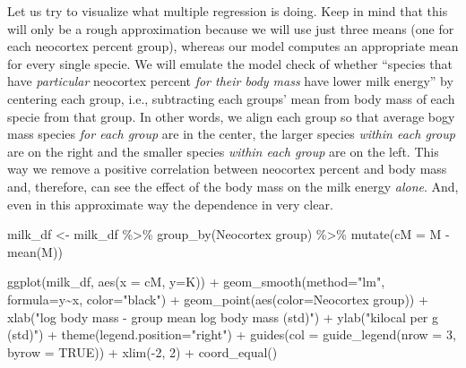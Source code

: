 \documentclass[
]{book}
\newenvironment{Shaded}{\begin{snugshade}}{\end{snugshade}}
\newcommand{\AttributeTok}[1]{\textcolor[rgb]{0.77,0.63,0.00}{#1}}
\newcommand{\ConstantTok}[1]{\textcolor[rgb]{0.00,0.00,0.00}{#1}}
\newcommand{\DecValTok}[1]{\textcolor[rgb]{0.00,0.00,0.81}{#1}}
\newcommand{\FunctionTok}[1]{\textcolor[rgb]{0.00,0.00,0.00}{#1}}
\newcommand{\NormalTok}[1]{#1}
\newcommand{\OtherTok}[1]{\textcolor[rgb]{0.56,0.35,0.01}{#1}}
\newcommand{\SpecialCharTok}[1]{\textcolor[rgb]{0.00,0.00,0.00}{#1}}
\newcommand{\StringTok}[1]{\textcolor[rgb]{0.31,0.60,0.02}{#1}}
\begin{document}
Let us try to visualize what multiple regression is doing. Keep in mind that this will only be a rough approximation because we will use just three means (one for each neocortex percent group), whereas our model computes an appropriate mean for every single specie. We will emulate the model check of whether ``species that have \emph{particular} neocortex percent \emph{for their body mass} have lower milk energy'' by centering each group, i.e., subtracting each groups' mean from body mass of each specie from that group. In other words, we align each group so that average bogy mass species \emph{for each group} are in the center, the larger species \emph{within each group} are on the right and the smaller species \emph{within each group} are on the left. This way we remove a positive correlation between neocortex percent and body mass and, therefore, can see the effect of the body mass on the milk energy \emph{alone}. And, even in this approximate way the dependence in very clear.

\begin{Shaded}
\begin{Highlighting}[]
\NormalTok{milk\_df }\OtherTok{\textless{}{-}} 
\NormalTok{  milk\_df }\SpecialCharTok{\%\textgreater{}\%}
  \FunctionTok{group\_by}\NormalTok{(}\StringTok{\textasciigrave{}}\AttributeTok{Neocortex group}\StringTok{\textasciigrave{}}\NormalTok{) }\SpecialCharTok{\%\textgreater{}\%}
  \FunctionTok{mutate}\NormalTok{(}\AttributeTok{cM =}\NormalTok{ M }\SpecialCharTok{{-}} \FunctionTok{mean}\NormalTok{(M))}

\FunctionTok{ggplot}\NormalTok{(milk\_df, }\FunctionTok{aes}\NormalTok{(}\AttributeTok{x =}\NormalTok{ cM, }\AttributeTok{y=}\NormalTok{K)) }\SpecialCharTok{+} 
  \FunctionTok{geom\_smooth}\NormalTok{(}\AttributeTok{method=}\StringTok{"lm"}\NormalTok{, }\AttributeTok{formula=}\NormalTok{y}\SpecialCharTok{\textasciitilde{}}\NormalTok{x, }\AttributeTok{color=}\StringTok{"black"}\NormalTok{) }\SpecialCharTok{+}
  \FunctionTok{geom\_point}\NormalTok{(}\FunctionTok{aes}\NormalTok{(}\AttributeTok{color=}\StringTok{\textasciigrave{}}\AttributeTok{Neocortex group}\StringTok{\textasciigrave{}}\NormalTok{)) }\SpecialCharTok{+} 
  \FunctionTok{xlab}\NormalTok{(}\StringTok{"log body mass {-} group mean log body mass (std)"}\NormalTok{) }\SpecialCharTok{+} 
  \FunctionTok{ylab}\NormalTok{(}\StringTok{"kilocal per g (std)"}\NormalTok{) }\SpecialCharTok{+} 
  \FunctionTok{theme}\NormalTok{(}\AttributeTok{legend.position=}\StringTok{"right"}\NormalTok{) }\SpecialCharTok{+}
  \FunctionTok{guides}\NormalTok{(}\AttributeTok{col =} \FunctionTok{guide\_legend}\NormalTok{(}\AttributeTok{nrow =} \DecValTok{3}\NormalTok{, }\AttributeTok{byrow =} \ConstantTok{TRUE}\NormalTok{)) }\SpecialCharTok{+}
  \FunctionTok{xlim}\NormalTok{(}\SpecialCharTok{{-}}\DecValTok{2}\NormalTok{, }\DecValTok{2}\NormalTok{) }\SpecialCharTok{+}
  \FunctionTok{coord\_equal}\NormalTok{()}
\end{Highlighting}
\end{Shaded}
\end{document}
